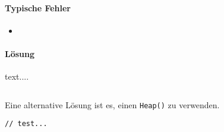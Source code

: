 \documentclass[babel]{book}
\begin{document}
\begin{lstlisting}[caption=My Javascript Example]

\end{lstlisting}

\paragraph{Typische Fehler}
\begin{itemize} 
	\item 
\end{itemize}

\paragraph{Lösung}
text....

\begin{lstlisting}[caption=My Javascript Example]

\end{lstlisting}

Eine alternative Lösung ist es, einen \lstinline|Heap()| zu verwenden.
\begin{lstlisting}[caption=My Javascript Example]
// test...

\end{lstlisting}
\end{document}
